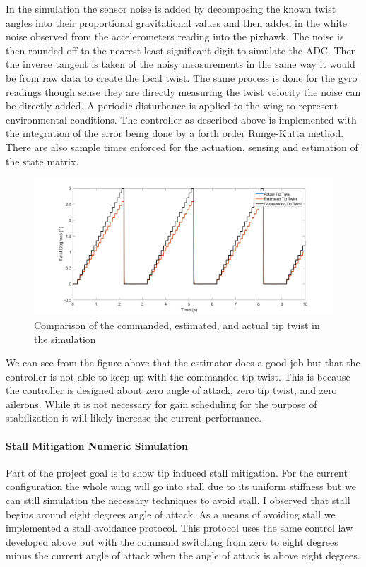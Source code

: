 \documentclass[11pt]{ucthesis}
\begin{document}
In the simulation the sensor noise is added by decomposing the known twist angles into their proportional gravitational values and then added in the white noise observed from the accelerometers reading into the pixhawk. The noise is then rounded off to the nearest least significant digit to simulate the ADC. Then the inverse tangent is taken of the noisy measurements in the same way it would be from raw data to create the local twist. The same process is done for the gyro readings though sense they are directly measuring the twist velocity the noise can be directly added. A periodic disturbance is applied to the wing to represent environmental conditions. The controller as described above is implemented with the integration of the error being done by a forth order Runge-Kutta method. There are also sample times enforced for the actuation, sensing and estimation of the state matrix.

\begin{figure}[h]
\centering
\includegraphics[width=1\linewidth]{Figures/ProversYawTipTwist.png}
\caption{Comparison of the commanded, estimated, and actual tip twist in the simulation}
\label{fig:APcommand}
\end{figure}

We can see from the figure above that the estimator does a good job but that the controller is not able to keep up with the commanded tip twist. This is because the controller is designed about zero angle of attack, zero tip twist, and zero ailerons. While it is not necessary for gain scheduling for the purpose of stabilization it will likely increase the current performance.

\paragraph{Stall Mitigation Numeric Simulation}
\label{sec:stallSim}
Part of the project goal is to show tip induced stall mitigation. For the current configuration the whole wing will go into stall due to its uniform stiffness but we can still simulation the necessary techniques to avoid stall. I observed that stall begins around eight degrees angle of attack. As a means of avoiding stall we implemented a stall avoidance protocol. This protocol uses the same control law developed above but with the command switching from zero to eight degrees minus the current angle of attack when the angle of attack is above eight degrees. 
\end{document}
